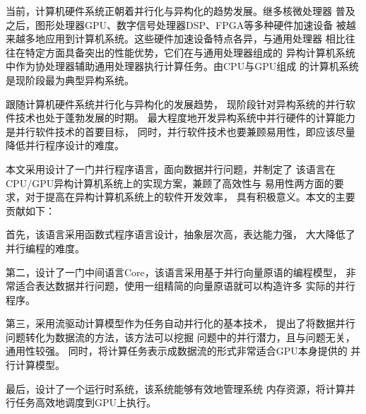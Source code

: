 \begin{cabstract}
当前，计算机硬件系统正朝着并行化与异构化的趋势发展。继多核微处理器
普及之后，图形处理器GPU、数字信号处理器DSP、FPGA等多种硬件加速设备
被越来越多地应用到计算机系统。这些硬件加速设备特点各异，与通用处理器
相比往往在特定方面具备突出的性能优势，它们在与通用处理器组成的
异构计算机系统中作为协处理器辅助通用处理器执行计算任务。由CPU与GPU组成
的计算机系统是现阶段最为典型异构系统。

跟随计算机硬件系统并行化与异构化的发展趋势，
现阶段针对异构系统的并行软件技术也处于蓬勃发展的时期。
最大程度地开发异构系统中并行硬件的计算能力是并行软件技术的首要目标，
同时，并行软件技术也要兼顾易用性，即应该尽量降低并行程序设计的难度。

本文采用设计了一门并行程序语言，面向数据并行问题，并制定了
该语言在CPU/GPU异构计算机系统上的实现方案，兼顾了高效性与
易用性两方面的要求，对于提高在异构计算机系统上的软件开发效率，
具有积极意义。本文的主要贡献如下：

首先，该语言采用函数式程序语言设计，抽象层次高，表达能力强，
大大降低了并行编程的难度。

第二，设计了一门中间语言Core，该语言采用基于并行向量原语的编程模型，
非常适合表达数据并行问题，使用一组精简的向量原语就可以构造许多
实际的并行程序。

第三，采用流驱动计算模型作为任务自动并行化的基本技术，
提出了将数据并行问题转化为数据流的方法，该方法可以挖掘
问题中的并行潜力，且与问题无关，通用性较强。
同时，将计算任务表示成数据流的形式非常适合GPU本身提供的
并行计算模型。

最后，设计了一个运行时系统，该系统能够有效地管理系统
内存资源，将计算并行任务高效地调度到GPU上执行。


\end{cabstract}


